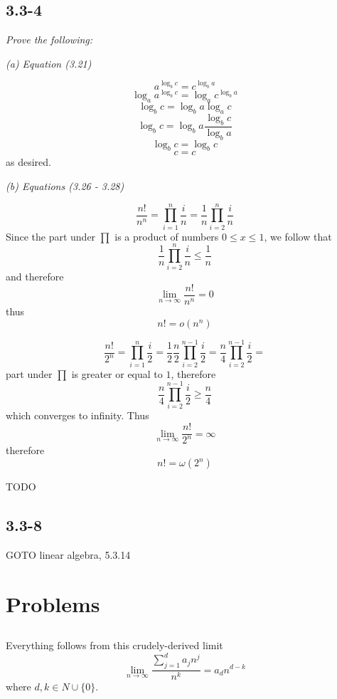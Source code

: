 \documentclass[11pt,oneside,titlepage]{book}
\begin{document}
\subsection*{3.3-4}

\textit{Prove the following: }

\textit{(a) Equation (3.21)}

$$a^{\log_b{c}} = c^{\log_b{a}}$$
$$\log_a{a^{\log_b{c}}} = \log_a{c^{\log_b{a}}}$$
$$\log_b{c} = \log_b{a} \log_a{c}$$
$$\log_b{c} = \log_b{a} \frac{\log_b{c}}{\log_b{a}}$$
$$\log_b{c} = \log_b{c}$$
$$c = c$$
as desired.

\textit{(b) Equations (3.26 - 3.28)}


$$\frac{n!}{n^n} = \prod_{i = 1}^n{\frac{i}{n}} = \frac{1}{n} \prod_{i = 2}^n{\frac{i}{n}}$$
Since the part under $\prod$ is a product of numbers $0 \leq x \leq 1$, we follow that
$$\frac{1}{n} \prod_{i = 2}^n{\frac{i}{n}} \leq \frac{1}{n}$$
and therefore 
$$\lim_{n \to \infty}{\frac{n!}{n^n}} = 0$$
thus
$$n! = o(n^n)$$

$$\frac{n!}{2^n} = \prod_{i = 1}^{n}{\frac{i}{2}} =
\frac{1}{2} \frac{n}{2} \prod_{i = 2}^{n - 1}{\frac{i}{2}} =
\frac{n}{4} \prod_{i = 2}^{n - 1}{\frac{i}{2}} = 
$$
part under $\prod$ is greater or equal to $1$, therefore
$$\frac{n}{4} \prod_{i = 2}^{n - 1}{\frac{i}{2}} \geq \frac{n}{4}$$
which converges to infinity. Thus
$$\lim_{n \to \infty}{\frac{n!}{2^n}} = \infty$$
therefore
$$n! = \omega(2^n)$$

TODO


\subsection*{3.3-8}

GOTO linear algebra, 5.3.14

\section{Problems}

\subsection{}

Everything follows from this crudely-derived limit
$$\lim_{n \to \infty}{\frac{\sum_{j = 1}^d {a_j n^j}}{n^k}} = a_d n^{d - k} $$
where $d, k \in N \cup \{0\}$.
\end{document}
